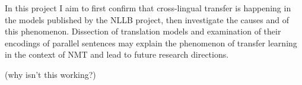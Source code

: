 In this project I aim to first confirm that cross-lingual transfer is happening in the models published by the NLLB project, 
then investigate the causes and of this phenomenon. Dissection of translation models and examination of their encodings of 
parallel sentences may explain the phenomenon of transfer learning in the context of NMT and lead to future research directions.

\cite{vaswani2017attention} (why isn't this working?)